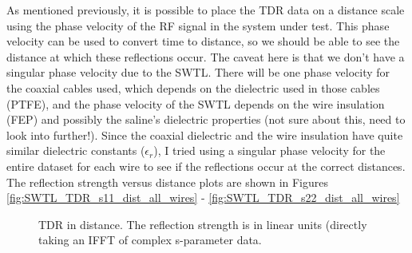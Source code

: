 \documentclass[12pt,onecolumn,titlepage]{article}
\begin{document}
As mentioned previously, it is possible to place the TDR data on a distance scale using the phase velocity of the RF signal in the system under test. This phase velocity can be used to convert time to distance, so we should be able to see the distance at which these reflections occur. The caveat here is that we don't have a singular phase velocity due to the SWTL. There will be one phase velocity for the coaxial cables used, which depends on the dielectric used in those cables (PTFE), and the phase velocity of the SWTL depends on the wire insulation (FEP) and possibly the saline's dielectric properties (not sure about this, need to look into further!). Since the coaxial dielectric and the wire insulation have quite similar dielectric constants ($\epsilon_r$), I tried using a singular phase velocity for the entire dataset for each wire to see if the reflections occur at the correct distances. The reflection strength versus distance plots are shown in Figures \ref{fig:SWTL_TDR_s11_dist_all_wires} - \ref{fig:SWTL_TDR_s22_dist_all_wires}


\begin{figure}[htbp]
	\centering
		\quad
	\label{fig:SWTL_TDR_dist_all_wires}
	\caption{TDR in distance. The reflection strength is in linear units (directly taking an IFFT of complex s-parameter data. }
\end{figure}
\end{document}
